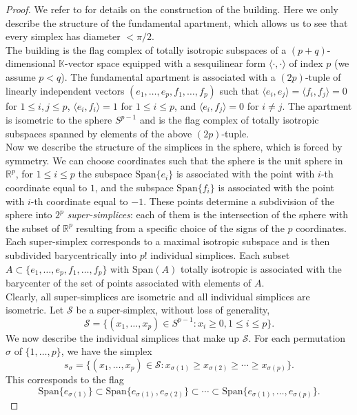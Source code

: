 \documentclass{article}
\theoremstyle{definition}
\theoremstyle{remark}
\theoremstyle{plain}
\begin{document}
\begin{proof}
    We refer to \cite{buildings} for details on the construction of the building. Here we only describe the structure of the fundamental apartment, which allows us to see that every simplex has diameter $<\pi/2$. \\

    The building is the flag complex of totally isotropic subspaces of a $(p+q)$-dimensional $\mathbb{K}$-vector space equipped with a sesquilinear form $\langle\cdot,\cdot\rangle$ of index $p$ (we assume $p<q$). The fundamental apartment is associated with a $(2p)$-tuple of linearly independent vectors $(e_1,\ldots,e_p,f_1,\ldots,f_p)$ such that $\langle e_i,e_j\rangle=\langle f_i,f_j\rangle=0$ for $1\leq i,j\leq p$, $\langle e_i,f_i\rangle=1$ for $1\leq i\leq p$, and $\langle e_i,f_j\rangle=0$ for $i\neq j$. The apartment is isometric to the sphere $S^{p-1}$ and is the flag complex of totally isotropic subspaces spanned by elements of the above $(2p)$-tuple. \\

    Now we describe the structure of the simplices in the sphere, which is forced by symmetry. We can choose coordinates such that the sphere is the unit sphere in $\mathbb{R}^p$, for $1\leq i\leq p$ the subspace $\mathrm{Span}\{e_i\}$ is associated with the point with $i$-th coordinate equal to $1$, and the subspace $\mathrm{Span}\{f_i\}$ is associated with the point with $i$-th coordinate equal to $-1$. These points determine a subdivision of the sphere into $2^p$ \textit{super-simplices}: each of them is the intersection of the sphere with the subset of $\mathbb{R}^p$ resulting from a specific choice of the signs of the $p$ coordinates. Each super-simplex corresponds to a maximal isotropic subspace and is then subdivided barycentrically into $p!$ individual simplices. Each subset $A\subset\{e_1,\ldots,e_p,f_1,\ldots,f_p\}$ with $\mathrm{Span}(A)$ totally isotropic is associated with the barycenter of the set of points associated with elements of $A$. \\

    Clearly, all super-simplices are isometric and all individual simplices are isometric. Let $\mathcal{S}$ be a super-simplex, without loss of generality, $$\mathcal{S}=\{(x_1,\ldots,x_p)\in S^{p-1}: x_i\geq 0, 1\leq i\leq p\}.$$
    We now describe the individual simplices that make up $\mathcal{S}$. For each permutation $\sigma$ of $\{1,\ldots,p\}$, we have the simplex $$s_\sigma=\{(x_1,\ldots,x_p)\in\mathcal{S}: x_{\sigma(1)}\geq x_{\sigma(2)}\geq\cdots\geq x_{\sigma(p)}\}.$$ This corresponds to the flag $$\mathrm{Span}\{e_{\sigma(1)}\}\subset\mathrm{Span}\{e_{\sigma(1)},e_{\sigma(2)}\}\subset\cdots\subset\mathrm{Span}\{e_{\sigma(1)},\ldots,e_{\sigma(p)}\}.$$


\end{proof}
\end{document}
